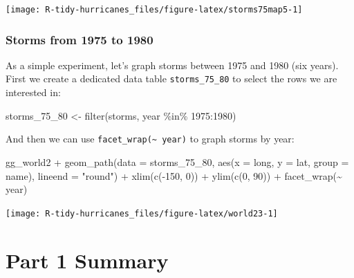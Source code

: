 \documentclass[
]{book}
\newenvironment{Shaded}{\begin{snugshade}}{\end{snugshade}}
\newcommand{\AttributeTok}[1]{\textcolor[rgb]{0.77,0.63,0.00}{#1}}
\newcommand{\DecValTok}[1]{\textcolor[rgb]{0.00,0.00,0.81}{#1}}
\newcommand{\FunctionTok}[1]{\textcolor[rgb]{0.00,0.00,0.00}{#1}}
\newcommand{\NormalTok}[1]{#1}
\newcommand{\OtherTok}[1]{\textcolor[rgb]{0.56,0.35,0.01}{#1}}
\newcommand{\SpecialCharTok}[1]{\textcolor[rgb]{0.00,0.00,0.00}{#1}}
\newcommand{\StringTok}[1]{\textcolor[rgb]{0.31,0.60,0.02}{#1}}
\begin{document}
\begin{center}\texttt{[image: R-tidy-hurricanes\_files/figure-latex/storms75map5-1]} \end{center}

\hypertarget{storms-from-1975-to-1980}{%
\subsection{Storms from 1975 to 1980}\label{storms-from-1975-to-1980}}

As a simple experiment, let's graph storms between 1975 and 1980 (six years).
First we create a dedicated data table \texttt{storms\_75\_80} to select the rows we are
interested in:

\begin{Shaded}
\begin{Highlighting}[]
\NormalTok{storms\_75\_80 }\OtherTok{\textless{}{-}} \FunctionTok{filter}\NormalTok{(storms, year }\SpecialCharTok{\%in\%} \DecValTok{1975}\SpecialCharTok{:}\DecValTok{1980}\NormalTok{)}
\end{Highlighting}
\end{Shaded}

And then we can use \texttt{facet\_wrap(\textasciitilde{}\ year)} to graph storms by year:

\begin{Shaded}
\begin{Highlighting}[]
\NormalTok{gg\_world2 }\SpecialCharTok{+}
  \FunctionTok{geom\_path}\NormalTok{(}\AttributeTok{data =}\NormalTok{ storms\_75\_80,}
             \FunctionTok{aes}\NormalTok{(}\AttributeTok{x =}\NormalTok{ long, }\AttributeTok{y =}\NormalTok{ lat, }\AttributeTok{group =}\NormalTok{ name),}
             \AttributeTok{lineend =} \StringTok{"round"}\NormalTok{) }\SpecialCharTok{+}
  \FunctionTok{xlim}\NormalTok{(}\FunctionTok{c}\NormalTok{(}\SpecialCharTok{{-}}\DecValTok{150}\NormalTok{, }\DecValTok{0}\NormalTok{)) }\SpecialCharTok{+} 
  \FunctionTok{ylim}\NormalTok{(}\FunctionTok{c}\NormalTok{(}\DecValTok{0}\NormalTok{, }\DecValTok{90}\NormalTok{)) }\SpecialCharTok{+} 
  \FunctionTok{facet\_wrap}\NormalTok{(}\SpecialCharTok{\textasciitilde{}}\NormalTok{ year)}
\end{Highlighting}
\end{Shaded}

\begin{center}\texttt{[image: R-tidy-hurricanes\_files/figure-latex/world23-1]} \end{center}

\hypertarget{part-1-summary}{%
\chapter{Part 1 Summary}\label{part-1-summary}}
\end{document}
